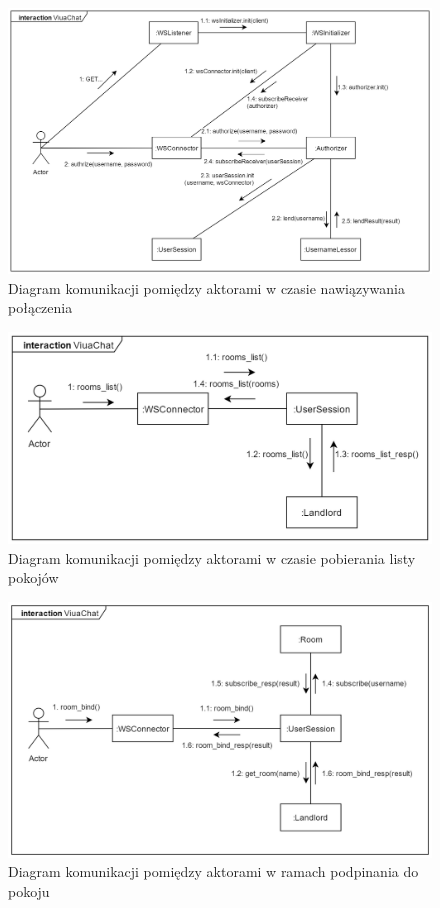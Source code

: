 \begin{figure}[!htp]
	\centering
	\includegraphics[width=\textwidth]{chat/fig/com-diag-init}
	\caption{Diagram komunikacji pomiędzy aktorami w czasie nawiązywania połączenia}
	\label{com-diag-init}
\end{figure}

\begin{figure}[!htp]
	\centering
	\includegraphics[width=\textwidth]{chat/fig/com-diag-rooms-list}
	\caption{Diagram komunikacji pomiędzy aktorami w czasie pobierania listy pokojów}
	\label{com-diag-rooms-list}
\end{figure}

\begin{figure}[!htp]
	\centering
	\includegraphics[width=\textwidth]{chat/fig/com-diag-room-bind}
	\caption{Diagram komunikacji pomiędzy aktorami w ramach podpinania do pokoju}
	\label{com-diag-room-bind}
\end{figure}

